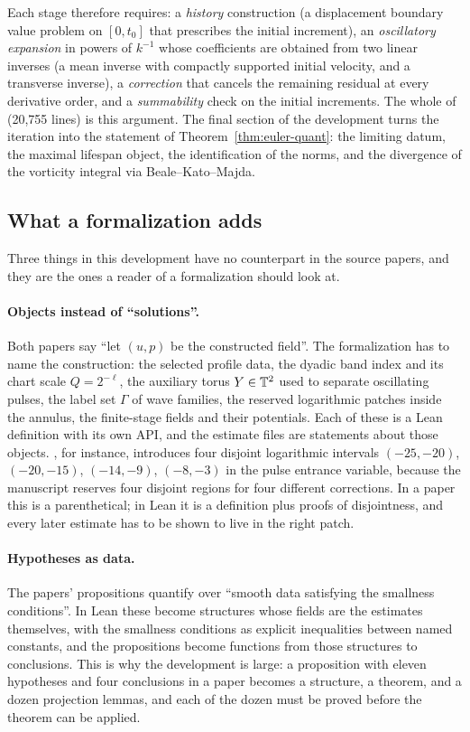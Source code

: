 Each stage therefore requires: a \emph{history} construction (a displacement boundary value
problem on $[0,t_0]$ that prescribes the initial increment), an \emph{oscillatory expansion}
in powers of $k^{-1}$ whose coefficients are obtained from two linear inverses (a mean
inverse with compactly supported initial velocity, and a transverse inverse), a
\emph{correction} that cancels the remaining residual at every derivative order, and a
\emph{summability} check on the initial increments. The whole of
 (20{,}755 lines) is this argument. The final section of the
development turns the iteration into the statement of Theorem~\ref{thm:euler-quant}: the
limiting datum, the maximal lifespan object, the identification of the norms, and the
divergence of the vorticity integral via Beale--Kato--Majda.

\subsection{What a formalization adds}
\label{sec:adds}

Three things in this development have no counterpart in the source papers, and they are the
ones a reader of a formalization should look at.

\paragraph{Objects instead of ``solutions''.} Both papers say ``let $(u,p)$ be the
constructed field''. The formalization has to name the construction: the selected profile
data, the dyadic band index and its chart scale $Q=2^{-\ell}$, the auxiliary torus
$Y\in\mathbb{T}^2$ used to separate oscillating pulses, the label set $\Gamma$ of wave families, the
reserved logarithmic patches inside the annulus, the finite-stage fields and their
potentials. Each of these is a Lean definition with its own API, and the estimate files are
statements about those objects. , for instance,
introduces four disjoint logarithmic intervals $(-25,-20)$, $(-20,-15)$, $(-14,-9)$,
$(-8,-3)$ in the pulse entrance variable, because the manuscript reserves four disjoint
regions for four different corrections. In a paper this is a parenthetical; in Lean it is a
definition plus proofs of disjointness, and every later estimate has to be shown to live in
the right patch.

\paragraph{Hypotheses as data.} The papers' propositions quantify over ``smooth data
satisfying the smallness conditions''. In Lean these become structures whose fields are the
estimates themselves, with the smallness conditions as explicit inequalities between named
constants, and the propositions become functions from those structures to conclusions. This
is why the development is large: a proposition with eleven hypotheses and four conclusions
in a paper becomes a structure, a theorem, and a dozen projection lemmas, and each of the
dozen must be proved before the theorem can be applied.

